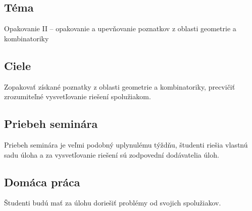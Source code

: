 
\subsection*{Téma}
Opakovanie II -- opakovanie a upevňovanie poznatkov z oblasti geometrie a kombinatoriky

\subsection*{Ciele}
Zopakovať získané poznatky z oblasti geometrie a kombinatoriky, precvičiť zrozumiteľné vysvetľovanie riešení spolužiakom.

\subsection*{Priebeh seminára}
Priebeh seminára je veľmi podobný uplynulému týždňu, študenti riešia vlastnú sadu úloha a za vysvetľovanie riešení sú zodpovední dodávatelia úloh.

\subsection*{Domáca práca}
Študenti budú mať za úlohu doriešiť problémy od svojich spolužiakov.

